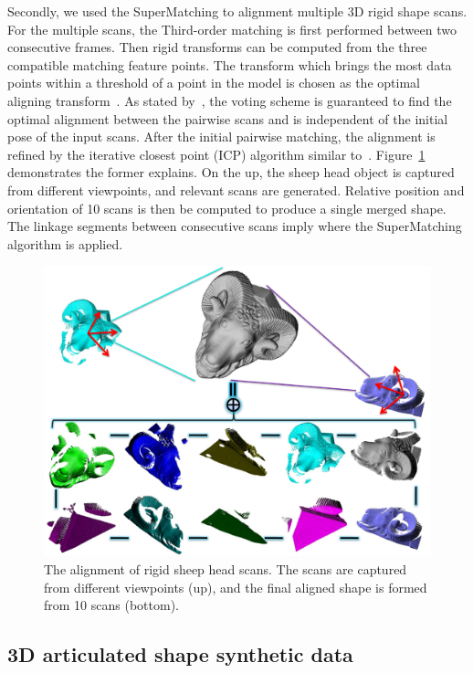 Secondly, we used the SuperMatching to alignment multiple 3D rigid shape scans.
For the multiple scans, the Third-order matching is first performed between two consecutive frames.
Then rigid transforms can be computed from the three compatible matching feature points.
The transform which brings the most data points within a threshold of a point in the model is chosen as the optimal aligning transform~\cite{Huttenlocher90}.
As stated by~\cite{Gelfand05}, the voting scheme is guaranteed to find the optimal alignment 
between the pairwise scans and is independent of the initial pose of the input scans.
After the initial pairwise matching, the alignment is refined by the iterative closest point (ICP) algorithm similar to~\cite{Gelfand05}.
Figure~\ref{fig:3DRigid} demonstrates the former explains.
On the up, the sheep head object is captured from different viewpoints, and relevant scans are generated.
Relative position and orientation of 10 scans is then be computed to produce a single merged shape.
The linkage segments between consecutive scans imply where the SuperMatching algorithm is applied.

\begin{figure}
\centering
  \includegraphics[width=0.99\linewidth]{figures/3DRigid.pdf}
  \caption{The alignment of rigid sheep head scans. The scans are captured from different viewpoints (up), and the final aligned shape is formed from 10 scans (bottom).}
\label{fig:3DRigid}
\end{figure}

\subsection{3D articulated shape synthetic data}
\label{subsec:3darticulated}

